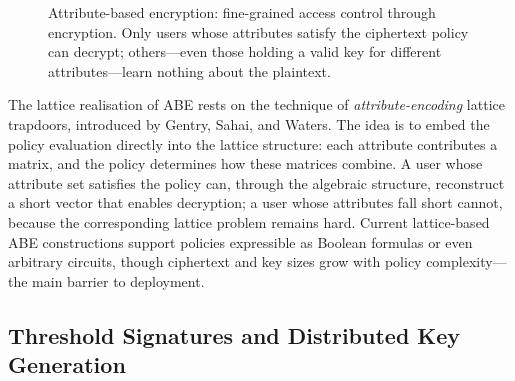 \begin{figure}[t]
\centering
{}
\caption{Attribute-based encryption: fine-grained access control through encryption.  Only users whose attributes satisfy the ciphertext policy can decrypt; others---even those holding a valid key for different attributes---learn nothing about the plaintext.}
\label{fig:ch16-abe}
\end{figure}

The lattice realisation of ABE rests on the technique of \emph{attribute-encoding} lattice trapdoors, introduced by Gentry, Sahai, and Waters.  The idea is to embed the policy evaluation directly into the lattice structure: each attribute contributes a matrix, and the policy determines how these matrices combine.  A user whose attribute set satisfies the policy can, through the algebraic structure, reconstruct a short vector that enables decryption; a user whose attributes fall short cannot, because the corresponding lattice problem remains hard.  Current lattice-based ABE constructions support policies expressible as Boolean formulas or even arbitrary circuits, though ciphertext and key sizes grow with policy complexity---the main barrier to deployment.


\subsection{Threshold Signatures and Distributed Key Generation}
\label{subsec:threshold}

